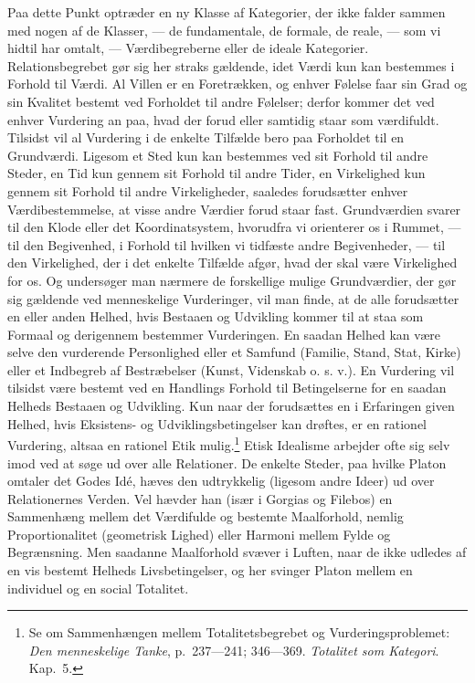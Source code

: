 \documentclass[12pt]{article}
\newcommand{\opage}[1]{\marginnote{\footnotesize\textit{[#1]}}}
\begin{document}
Paa dette Punkt optræder en ny Klasse af Kategorier, der ikke falder
sammen med nogen af de Klasser, --- de fundamentale, de formale, de
reale, --- som vi hidtil har omtalt, --- Værdibegreberne eller de ideale
Kategorier. Relationsbegrebet gør sig her straks gældende, idet Værdi
kun kan bestemmes i Forhold til Værdi. Al Villen er en Foretrækken, og
enhver Følelse faar sin Grad og sin Kvalitet bestemt ved Forholdet til
andre Følelser; derfor kommer det ved enhver Vurdering an paa, hvad der
forud eller samtidig staar som værdifuldt. Tilsidst vil al Vurdering i
de enkelte Tilfælde bero paa Forholdet til en Grundværdi. Ligesom et
Sted kun kan bestemmes ved sit Forhold til andre Steder, en Tid kun
gennem sit Forhold til andre Tider, en Virkelighed kun gennem sit
Forhold til andre Virkeligheder, saaledes forudsætter enhver
Værdibestemmelse, at visse andre Værdier forud staar fast. Grundværdien
svarer til den Klode eller det Koordinatsystem, hvorudfra vi orienterer
os i Rummet, --- til den Begivenhed, i Forhold til hvilken vi tidfæste
andre Begivenheder, --- til den Virkelighed, der i det enkelte Tilfælde
afgør, hvad der skal være Virkelighed for os. Og undersøger man nærmere
de forskellige mulige Grundværdier, der gør sig gældende ved
menneskelige Vurderinger, vil man finde, at de alle forudsætter en eller
anden Helhed, hvis Bestaaen og Udvikling kommer til at staa som Formaal
og derigennem bestemmer Vurderingen. En saadan Helhed kan være selve den
vurderende Personlighed eller et Samfund (Familie, Stand, Stat, Kirke)
eller et Indbegreb af Bestræbelser (Kunst, Videnskab o. s. v.). En
Vurdering vil tilsidst være bestemt
\opage{83} \setcounter{footnote}{0}
ved en Handlings Forhold til Betingelserne for en saadan Helheds
Bestaaen og Udvikling. Kun naar der forudsættes en i Erfaringen given
Helhed, hvis Eksistens- og Udviklingsbetingelser kan drøftes, er en
rationel Vurdering, altsaa en rationel Etik mulig.\footnote{Se om
Sammenhængen mellem Totalitetsbegrebet og Vurderingsproblemet:
\textit{Den menneskelige Tanke}, p.~237---241; 346---369. \textit{Totalitet
som Kategori}. Kap.~5.}
Etisk Idealisme arbejder ofte sig selv imod ved at søge ud over alle
Relationer. De enkelte Steder, paa hvilke Platon omtaler
\guillemotright det Godes Idé\guillemotleft, hæves den udtrykkelig
(ligesom andre Ideer) ud over Relationernes Verden. Vel hævder han
(især i \guillemotright Gorgias\guillemotleft{} og \guillemotright
Filebos\guillemotleft) en Sammenhæng mellem det Værdifulde og bestemte
Maalforhold, nemlig Proportionalitet (\guillemotright geometrisk
Lighed\guillemotleft) eller Harmoni mellem Fylde og Begrænsning. Men
saadanne Maalforhold svæver i Luften, naar de ikke udledes af en vis
bestemt Helheds Livsbetingelser, og her svinger Platon mellem en
individuel og en social Totalitet.
\end{document}
